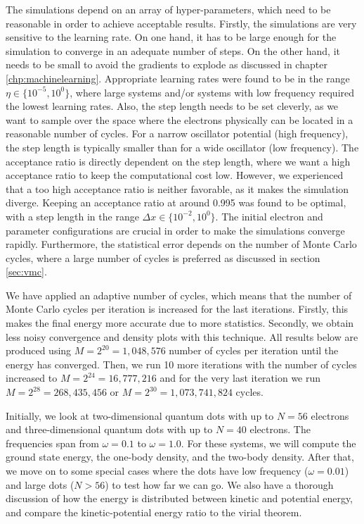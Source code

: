 The simulations depend on an array of hyper-parameters, which need to be reasonable in order to achieve acceptable results. Firstly, the simulations are very sensitive to the learning rate. On one hand, it has to be large enough for the simulation to converge in an adequate number of steps. On the other hand, it needs to be small to avoid the gradients to explode as discussed in chapter \ref{chp:machinelearning}. Appropriate learning rates were found to be in the range $\eta\in\{10^{-5}, 10^{0}\}$, where large systems and/or systems with low frequency required the lowest learning rates. Also, the step length needs to be set cleverly, as we want to sample over the space where the electrons physically can be located in a reasonable number of cycles. For a narrow oscillator potential (high frequency), the step length is typically smaller than for a wide oscillator (low frequency). The acceptance ratio is directly dependent on the step length, where we want a high acceptance ratio to keep the computational cost low. However, we experienced that a too high acceptance ratio is neither favorable, as it makes the simulation diverge. Keeping an acceptance ratio at around 0.995 was found to be optimal, with a step length in the range $\Delta x\in\{10^{-2},10^0\}$. The initial electron and parameter configurations are crucial in order to make the simulations converge rapidly. Furthermore, the statistical error depends on the number of Monte Carlo cycles, where a large number of cycles is preferred as discussed in section \ref{sec:vmc}. 

We have applied an adaptive number of cycles, which means that the number of Monte Carlo cycles per iteration is increased for the last iterations. Firstly, this makes the final energy more accurate due to more statistics. Secondly, we obtain less noisy convergence and density plots with this technique. All results below are produced using $M=2^{20}=1,048,576$ number of cycles per iteration until the energy has converged. Then, we run 10 more iterations with the number of cycles increased to $M=2^{24}=16,777,216$ and for the very last iteration we run $M=2^{28}=268,435,456$ or $M=2^{30}=1,073,741,824$ cycles.

Initially, we look at two-dimensional quantum dots with up to $N=56$ electrons and three-dimensional quantum dots with up to $N=40$ electrons. The frequencies span from  $\omega=0.1$ to $\omega=1.0$. For these systems, we will compute the ground state energy, the one-body density, and the two-body density. After that, we move on to some special cases where the dots have low frequency ($\omega=0.01$) and large dots ($N>56$) to test how far we can go. We also have a thorough discussion of how the energy is distributed between kinetic and potential energy, and compare the kinetic-potential energy ratio to the virial theorem.

